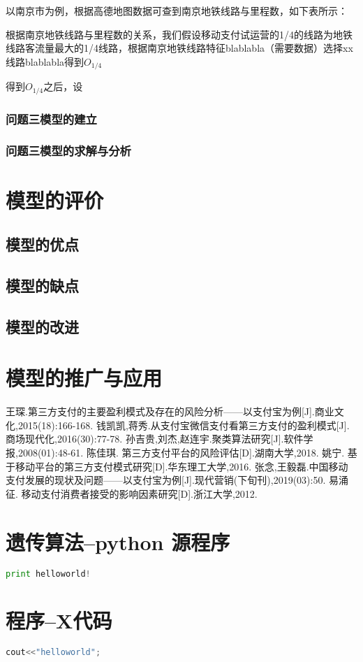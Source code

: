 \documentclass[withoutpreface,bwprint]{cumcmthesis} %
\begin{document}
以南京市为例，根据高德地图数据可查到南京地铁线路与里程数，如下表所示：

根据南京地铁线路与里程数的关系，我们假设移动支付试运营的1/4的线路为地铁线路客流量最大的1/4线路，根据南京地铁线路特征blablabla（需要数据）选择xx线路blablabla得到$O_{1/4}$

得到$O_{1/4}$之后，设

\subsubsection{问题三模型的建立}


\subsubsection{问题三模型的求解与分析}


\section{模型的评价}
\subsection{模型的优点}
\subsection{模型的缺点}
\subsection{模型的改进}
\section{模型的推广与应用}


\begin{thebibliography}{9}%
  王琛.第三方支付的主要盈利模式及存在的风险分析——以支付宝为例[J].商业文化,2015(18):166-168.
 钱凯凯,蒋秀.从支付宝微信支付看第三方支付的盈利模式[J].商场现代化,2016(30):77-78.
 孙吉贵,刘杰,赵连宇.聚类算法研究[J].软件学报,2008(01):48-61.
 陈佳琪. 第三方支付平台的风险评估[D].湖南大学,2018.
 姚宁. 基于移动平台的第三方支付模式研究[D].华东理工大学,2016.
 张念,王毅磊.中国移动支付发展的现状及问题——以支付宝为例[J].现代营销(下旬刊),2019(03):50.
 易涌征. 移动支付消费者接受的影响因素研究[D].浙江大学,2012.
 
\end{thebibliography}

\newpage
\begin{appendices}
\section{遗传算法--python 源程序}
\begin{lstlisting}[language=python]
print helloworld!
 \end{lstlisting}
 \section{程序--X代码}
\begin{lstlisting}[language=c]
cout<<"helloworld";
 \end{lstlisting}
\end{appendices}
\end{document}
